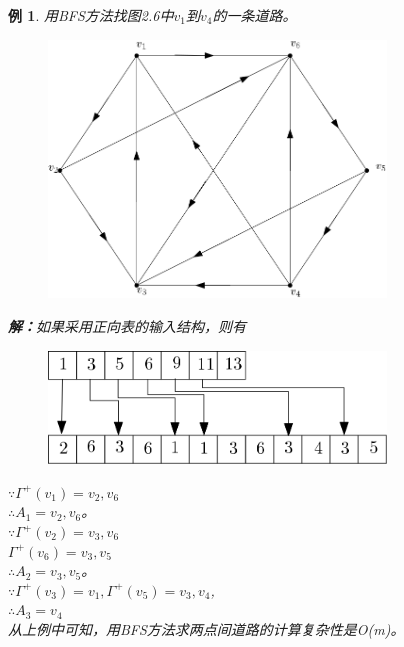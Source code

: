 \documentclass[11pt,a4paper,openany]{book}
\newtheorem{sample}{\textbf{例}}[section]
\begin{document}
\begin{sample}
用BFS方法找图2.6中$v_1$到$v_4$的一条道路。\\
\begin{figure}[!ht]
  \centering
  \includegraphics[width=0.8\textwidth]{2.6.png}\\
  \caption{}\label{fig:2.6}
\end{figure}
\textbf{解：}如果采用正向表的输入结构，则有\\
\begin{figure}[h]
  \centering
   \vspace{-10pt}
  \includegraphics[width=0.8\textwidth]{2.6BFS.png}\\
  \caption*{}\label{} \vspace{-40pt}
\end{figure}
$\because \Gamma^{+}(v_1)={v_2,v_6}$\\
$\therefore A_1={v_2,v_6}$。\\
$\because \Gamma^{+}(v_2)={v_3,v_6}$\\
$\Gamma^{+}(v_6)={v_3,v_5}$\\
$\therefore A_2={v_3,v_5}$。\\
$\because  \Gamma^{+}(v_3)={v_1},\Gamma^{+}(v_5)={v_3,v_4}$,\\
$\therefore A_3={v_4}$\\
\indent 从上例中可知，用BFS方法求两点间道路的计算复杂性是O(m)。
\end{sample}
\end{document}
